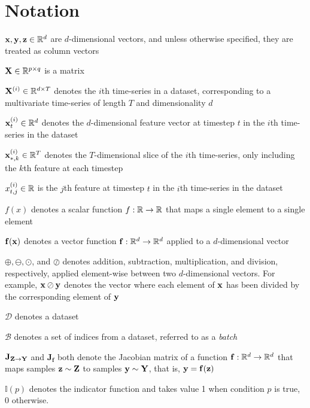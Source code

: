 \documentclass{statsmsc}
\begin{document}
{\thispagestyle{plain}
    \tableofcontents
}

{\chapter*{Notation}\thispagestyle{plain}
    $\mathbf{x}, \mathbf{y}, \mathbf{z}\in\mathbb{R}^d$ are $d$-dimensional vectors, and unless otherwise specified, they are
    treated as column vectors

    $\mathbf{X} \in \mathbb{R}^{p \times q}$ is a matrix

    $\mathbf{X}^{(i)} \in \mathbb{R}^{d \times T}$ denotes the $i$th time-series in a dataset, corresponding to a multivariate time-series of length $T$ and dimensionality $d$

    $\mathbf{x}^{(i)}_t \in \mathbb{R}^d$ denotes the $d$-dimensional feature vector at timestep $t$ in the $i$th time-series in the dataset

    $\mathbf{x}^{(i)}_{*,k} \in \mathbb{R}^T$ denotes the $T$-dimensional slice of the $i$th time-series, only including the $k$th feature at each timestep

    $x^{(i)}_{t,j}\in\mathbb{R}$ is the $j$th feature at timestep $t$ in the $i$th time-series in the dataset

    $f(x)$ denotes a scalar function $f: \mathbb{R} \rightarrow {\mathbb{R}}$ that maps a single element to a single element

    $\mathbf{f}(\mathbf{x})$ denotes a vector function $\mathbf{f}:\mathbb{R}^d \rightarrow {\mathbb{R}^d}$ applied to a $d$-dimensional vector

    $\oplus, \ominus, \odot$, and $\oslash$ denotes addition, subtraction, multiplication, and division, respectively, applied element-wise between two $d$-dimensional vectors. For example, $\mathbf{x} \oslash \mathbf{y}$ denotes the vector where each element of $\mathbf{x}$ has been divided by the corresponding element of $\mathbf{y}$

    $\mathcal{D}$ denotes a dataset

    $\mathcal{B}$ denotes a set of indices from a dataset, referred to as a \textit{batch}

    $\mathbf{J}_{\mathbf{Z} \rightarrow {\mathbf{Y}}}$ and $\mathbf{J}_{\mathbf{f}}$ both denote the Jacobian matrix of a function $\mathbf{f} : \mathbb{R}^d \rightarrow {\mathbb{R}^d}$ that maps samples $\mathbf{z} \sim \mathbf{Z}$ to samples $\mathbf{y} \sim \mathbf{Y}$, that is,
    $\mathbf{y}=\mathbf{f}(\mathbf{z})$

    $\mathbb{I}(p)$ denotes the indicator function and takes value 1 when condition $p$ is true,
    0 otherwise.

}
\end{document}
